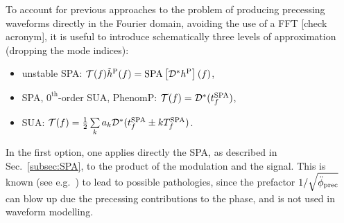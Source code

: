 \documentclass[aps,showpacs,twocolumn,
prd,superscriptaddress,nofootinbib]{revtex4-1}
\newcommand\calT{{\mathcal{T}}}
\newcommand\calD{{\mathcal{D}}}
\newcommand{\Tf}{T_{f}}
\newcommand{\tfSPA}{t_{f}^{\rm SPA}}
\newcommand{\SM}[1]{{\color{Red} #1}}
\begin{document}
To account for previous approaches to the problem of producing precessing waveforms directly in the Fourier domain, avoiding the use of a FFT \SM{[check acronym]}, it is useful to introduce schematically three levels of approximation (dropping the mode indices):
\begin{itemize}
	\item unstable SPA: $\calT(f) \tilde{h}^{\rm P}(f) = \mathrm{SPA}\left[ \calD^{*} h^{\rm P} \right](f)$,
	\item SPA, $0^{\text{th}}$-order SUA, PhenomP: $\calT(f) = \calD^{*}(\tfSPA) $,
	\item SUA: $\calT(f) = \frac{1}{2} \sum\limits_{k} a_{k} \calD^{*}(\tfSPA \pm k \Tf^{\rm SPA})$.
\end{itemize}

In the first option, one applies directly the SPA, as described in Sec.~\ref{subsec:SPA}, to the product of the modulation and the signal. This is known (see e.g.~\cite{KCY13}) to lead to possible pathologies, since the prefactor $1/\sqrt{\ddot{\phi}_{\rm prec}}$ can blow up due the precessing contributions to the phase, and is not used in waveform modelling.
\end{document}
